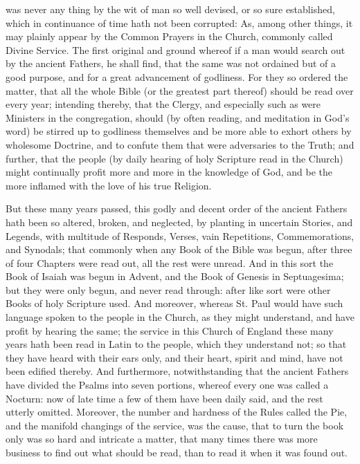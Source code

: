 
 was never any thing by the wit of man so well devised, or so sure established, which in continuance of time hath not been corrupted: As, among other things, it may plainly appear by the Common Prayers in the Church, commonly called Divine Service. The first original and ground whereof if a man would search out by the ancient Fathers, he shall find, that the same was not ordained but of a good purpose, and for a great advancement of godliness. For they so ordered the matter, that all the whole Bible (or the greatest part thereof) should be read over every year; intending thereby, that the Clergy, and especially such as were Ministers in the congregation, should (by often reading, and meditation in God's word) be stirred up to godliness themselves and be more able to exhort others by wholesome Doctrine, and to confute them that were adversaries to the Truth; and further, that the people (by daily hearing of holy Scripture read in the Church) might continually profit more and more in the knowledge of God, and be the more inflamed with the love of his true Religion.

But these many years passed, this godly and decent order of the ancient Fathers hath been so altered, broken, and neglected, by planting in uncertain Stories, and Legends, with multitude of Responds, Verses, vain Repetitions, Commemorations, and Synodals; that commonly when any Book of the Bible was begun, after three of four Chapters were read out, all the rest were unread. And in this sort the Book of Isaiah was begun in Advent, and the Book of Genesis in Septuagesima; but they were only begun, and never read through: after like sort were other Books of holy Scripture used. And moreover, whereas St. Paul would have such language spoken to the people in the Church, as they might understand, and have profit by hearing the same; the service in this Church of England these many years hath been read in Latin to the people, which they understand not; so that they have heard with their ears only, and their heart, spirit and mind, have not been edified thereby. And furthermore, notwithstanding that the ancient Fathers have divided the Psalms into seven portions, whereof every one was called a Nocturn: now of late time a few of them have been daily said, and the rest utterly omitted. Moreover, the number and hardness of the Rules called the Pie, and the manifold changings of the service, was the cause, that to turn the book only was so hard and intricate a matter, that many times there was more business to find out what should be read, than to read it when it was found out.

